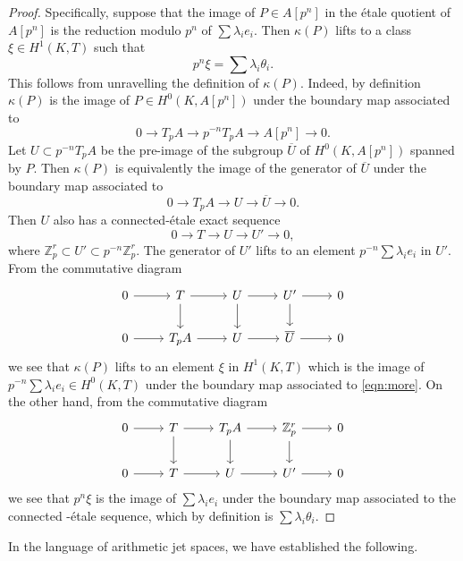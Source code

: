 \documentclass[11pt]{amsart}
\def\Z{\mathbb Z}
\theoremstyle{plain}
\theoremstyle{definition}
\begin{document}
\begin{proof}
Specifically, suppose that the image of $P \in A[p^n ]$ in the \'etale quotient of $A[p^n ]$ is the reduction modulo $p^n$ of $\sum \lambda _i e_i $. Then $\kappa (P)$ lifts to a class $\xi \in H^1 (K,T)$ such that 
\[
p^n \xi =\sum \lambda _i \theta _i .
\]
This follows from unravelling the definition of $\kappa (P)$. Indeed, by definition $\kappa (P)$ is the image of $P\in H^0 (K,A[p^n ])$ under the boundary map associated to
\[
0\to T_p A \to p^{-n}T_p A\to A[p^n]\to 0.
\]
Let $U\subset p^{-n}T_p A$ be the pre-image of the subgroup $\overline{U}$ of $H^0 (K,A[p^n ])$ spanned by $P$. Then $\kappa (P)$ is equivalently the image of the generator of $\overline{U}$ under the boundary map associated to 
\[
0\to T_p A\to U\to \overline{U}\to 0.
\]
Then $U$ also has a connected-\'etale exact sequence
\begin{equation}\label{eqn:more}
0\to T\to U \to U'\to 0,
\end{equation}
where $\Z _p ^r \subset U' \subset p^{-n}\Z _p ^r $. The generator of $U'$ lifts to an element $p^{-n}\sum \lambda _i e_i $ in $U'$. From the commutative diagram
\[
\begin{tikzcd}
0 \arrow[r] & T \arrow[d] \arrow[r] & U \arrow[d] \arrow[r] & U' \arrow[d] \arrow[r] & 0 \\
0 \arrow[r] & T_p A \arrow[r]           & U \arrow[r]           & \overline{U} \arrow[r]           & 0
\end{tikzcd}
\]
we see that $\kappa (P)$ lifts to an element $\xi $ in $H^1 (K,T)$ which is the image of $p^{-n}\sum \lambda _i e_i \in H^0 (K,T)$ under the boundary map associated to \eqref{eqn:more}. On the other hand, from the commutative diagram
\[
\begin{tikzcd}
0 \arrow[r] & T \arrow[d] \arrow[r] & T_p A \arrow[d] \arrow[r] & \Z _p ^r \arrow[d] \arrow[r] & 0 \\
0 \arrow[r] & T \arrow[r]           & U \arrow[r]           & U' \arrow[r]           & 0
\end{tikzcd}
\]
we see that $p^n \xi $ is the image of $\sum \lambda _i e_i$ under the boundary map associated to the connected -\'etale sequence, which by definition is $\sum \lambda _i \theta _i $.
\end{proof}
In the language of arithmetic jet spaces, we have established the following.
\end{document}
